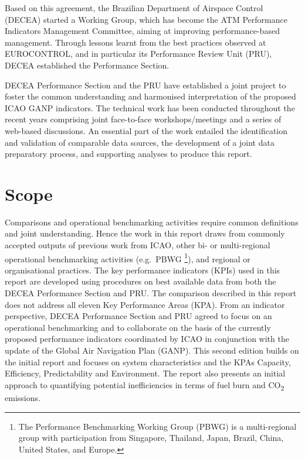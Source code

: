 \documentclass[
  a4paper,
  DIV=11,
  numbers=noendperiod]{scrreprt}
\begin{document}
Based on this agreement, the Brazilian Department of Airspace Control
(DECEA) started a Working Group, which has become the ATM Performance
Indicators Management Committee, aiming at improving performance-based
management. Through lessons learnt from the best practices observed at
EUROCONTROL, and in particular its Performance Review Unit (PRU), DECEA
established the Performance Section.

DECEA Performance Section and the PRU have established a joint project
to foster the common understanding and harmonised interpretation of the
proposed ICAO GANP indicators. The technical work has been conducted
throughout the recent years comprising joint face-to-face
workshops/meetings and a series of web-based discussions. An essential
part of the work entailed the identification and validation of
comparable data sources, the development of a joint data preparatory
process, and supporting analyses to produce this report.

\hypertarget{scope}{%
\section{Scope}\label{scope}}

Comparisons and operational benchmarking activities require common
definitions and joint understanding. Hence the work in this report draws
from commonly accepted outputs of previous work from ICAO, other bi- or
multi-regional operational benchmarking activities (e.g.~PBWG
\footnote{The Performance Benchmarking Working Group (PBWG) is a
  multi-regional group with participation from Singapore, Thailand,
  Japan, Brazil, China, United States, and Europe.}), and regional or
organisational practices. The key performance indicators (KPIs) used in
this report are developed using procedures on best available data from
both the DECEA Performance Section and PRU. The comparison described in
this report does not address all eleven Key Performance Areas (KPA).
From an indicator perspective, DECEA Performance Section and PRU agreed
to focus on an operational benchmarking and to collaborate on the basis
of the currently proposed performance indicators coordinated by ICAO in
conjunction with the update of the Global Air Navigation Plan (GANP).
This second edition builds on the initial report and focuses on system
characteristics and the KPAs Capacity, Efficiency, Predictability and
Environment. The report also presents an initial approach to quantifying
potential inefficiencies in terms of fuel burn and CO\textsubscript{2}
emissions.
\end{document}
